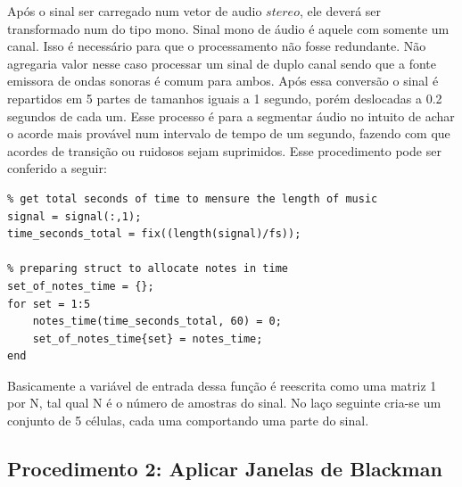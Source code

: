 Após o sinal ser carregado num vetor de audio $stereo$, ele deverá ser transformado num do tipo mono. Sinal mono de áudio é aquele com somente um canal. Isso é necessário para que o processamento não fosse redundante. Não agregaria valor nesse caso processar um sinal de duplo canal sendo que a fonte emissora de ondas sonoras é comum para ambos. Após essa conversão o sinal é repartidos em 5 partes de tamanhos iguais a 1 segundo, porém deslocadas a 0.2 segundos de cada um. Esse processo é para a segmentar áudio no intuito de achar o acorde mais provável num intervalo de tempo de um segundo, fazendo com que acordes de transição ou ruidosos sejam suprimidos. Esse procedimento pode ser conferido a seguir:
\begin{lstlisting}
% get total seconds of time to mensure the length of music 
signal = signal(:,1);
time_seconds_total = fix((length(signal)/fs)); 

% preparing struct to allocate notes in time
set_of_notes_time = {};
for set = 1:5
    notes_time(time_seconds_total, 60) = 0;
    set_of_notes_time{set} = notes_time;
end
\end{lstlisting}

Basicamente a variável de entrada dessa função é reescrita como uma matriz 1 por N, tal qual N é o número de amostras do sinal. No laço seguinte cria-se um conjunto de 5 células, cada uma comportando uma parte do sinal.

\subsection{Procedimento 2: Aplicar Janelas de Blackman}
\label{sec:transformada}

